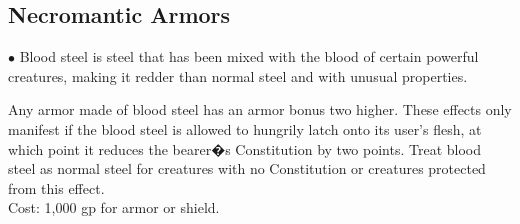 \subsection{Necromantic Armors}
\begin{list}{$\bullet$}{\itemspace}
 Blood steel is steel that has been mixed with the blood of certain powerful creatures, making it redder than normal steel and with unusual properties.

Any armor made of blood steel has an armor bonus two higher. These effects only manifest if the blood steel is allowed to hungrily latch onto its user's flesh, at which point it reduces the bearer�s Constitution by two points. Treat blood steel as normal steel for creatures with no Constitution or creatures protected from this effect.\\

Cost: 1,000 gp for armor or shield.\\

\end{list} 

\normalsections
